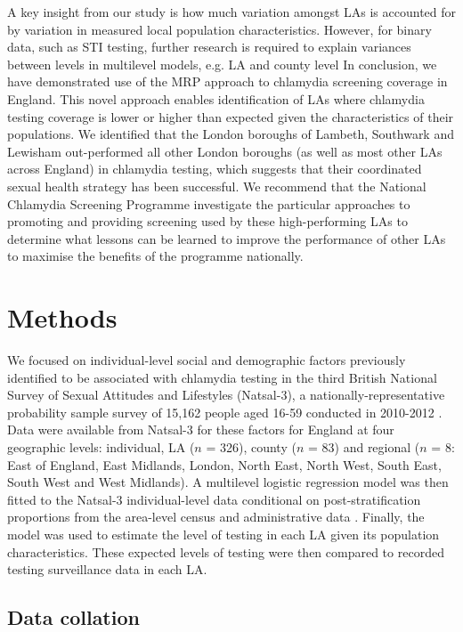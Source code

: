 \documentclass[12pt]{article}
\begin{document}
A key insight from our study is how much variation amongst LAs is accounted for by variation in measured local population characteristics. However, for binary data, such as STI testing, further research is required to explain variances between levels in multilevel models, e.g. LA and county level \cite{Gelman2006}
In conclusion, we have demonstrated use of the MRP approach to chlamydia screening coverage in England. This novel approach enables identification of LAs where chlamydia testing coverage is lower or higher than expected given the characteristics of their populations. We identified that the London boroughs of Lambeth, Southwark and Lewisham out-performed all other London boroughs (as well as most other LAs across England) in chlamydia testing, which suggests that their coordinated sexual health strategy \cite{LSLstrategy2014,MEDFASH2008} has been successful. We recommend that the National Chlamydia Screening Programme investigate the particular approaches to promoting and providing screening used by these high-performing LAs to determine what lessons can be learned to improve the performance of other LAs to maximise the benefits of the programme nationally. 


\section*{Methods}

We focused on individual-level social and demographic factors previously identified to be associated with chlamydia testing in the third British National Survey of Sexual Attitudes and Lifestyles (Natsal-3), a nationally-representative probability sample survey of 15,162 people aged 16-59 conducted in 2010-2012 \cite{Erens2014,Johnson2017}. Data were available from Natsal-3 for these factors for England at four geographic levels: individual, LA ($n$ = 326), county ($n$ = 83) and regional ($n$ = 8: East of England, East Midlands, London, North East, North West, South East, South West and West Midlands). A multilevel logistic regression model was then fitted to the Natsal-3 individual-level data conditional on post-stratification proportions from the area-level census and administrative data \cite{Park2004}. Finally, the model was used to estimate the level of testing in each LA given its population characteristics. These expected levels of testing were then compared to recorded testing surveillance data in each LA.

\subsection*{Data collation}
\end{document}
